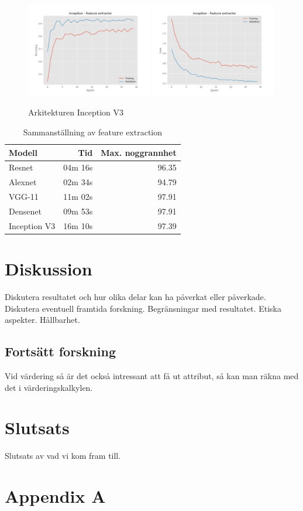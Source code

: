 \documentclass{kththesis}
\begin{document}
    \begin{figure}
      \centering
      \includegraphics[width=0.49\textwidth]{"./room/room-classification - acc - inception - feature extractor"}
      \includegraphics[width=0.49\textwidth]{"./room/room-classification - loss - inception - feature extractor"}
      \caption{Arkitekturen Inception V3}
    \end{figure}
    \begin{table}
      \centering
      \begin{tabular}{|l|r|r|}
        Modell & Tid & Max. noggrannhet \\ 
        \hline
        Resnet       & 04m 16s & 96.35 \\
        Alexnet      & 02m 34s & 94.79 \\
        VGG-11       & 11m 02s & 97.91 \\
        Densenet     & 09m 53s & 97.91 \\
        Inception V3 & 16m 10s & 97.39 \\
      \end{tabular}
      \caption{Sammanställning av feature extraction}
    \end{table}




\chapter{Diskussion}
Diskutera resultatet och hur olika delar kan ha påverkat eller påverkade. Diskutera eventuell framtida forskning. Begränsningar med resultatet.
Etiska aspekter. Hållbarhet. 

  \section{Fortsätt forskning}
  Vid värdering så är det också intressant att få ut attribut, så kan man räkna med det i värderingskalkylen.

\chapter{Slutsats}
Slutsats av vad vi kom fram till.

\printbibliography[heading=bibintoc]
\appendix
  \chapter{Appendix A}

\tailmatter
\end{document}
